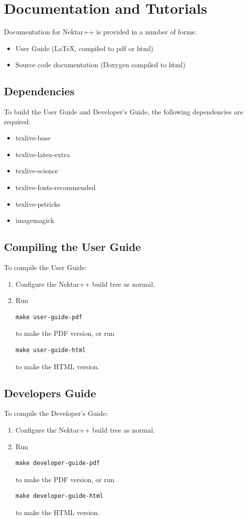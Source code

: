 \section{Documentation and Tutorials}

Documentation for Nektar++ is provided in a number of forms:
\begin{itemize}
    \item User Guide (LaTeX, compiled to pdf or html)
    \item Source code documentation (Doxygen compiled to html)
\end{itemize}

\subsection{Dependencies}
To build the User Guide and Developer's Guide, the following dependencies are required:
\begin{itemize}
    \item texlive-base
    \item texlive-latex-extra
    \item texlive-science
    \item texlive-fonts-recommended
    \item texlive-pstricks
    \item imagemagick
\end{itemize}

\subsection{Compiling the User Guide}
To compile the User Guide:
\begin{enumerate}
    \item Configure the Nektar++ build tree as normal.
    \item Run
    \begin{lstlisting}[style=BashInputStyle]
    make user-guide-pdf
    \end{lstlisting}
    to make the PDF version, or run
    \begin{lstlisting}[style=BashInputStyle]
    make user-guide-html
    \end{lstlisting}
    to make the HTML version.
\end{enumerate}


\subsection{Developers Guide}
To compile the Developer's Guide:
\begin{enumerate}
    \item Configure the Nektar++ build tree as normal.
    \item Run
    \begin{lstlisting}[style=BashInputStyle]
    make developer-guide-pdf
    \end{lstlisting}
    to make the PDF version, or run
    \begin{lstlisting}[style=BashInputStyle]
    make developer-guide-html
    \end{lstlisting}
    to make the HTML version.
\end{enumerate}

